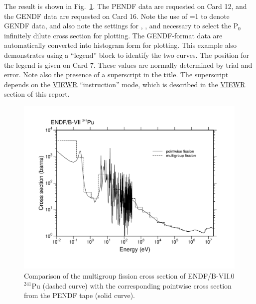 \noindent
The result is shown in Fig.~\ref{pvsm}.  The PENDF data are requested
on Card 12, and the GENDF data are requested on Card 16.  Note the
use of =1 to denote GENDF data, and also note the settings
for , , and  necessary to select the
P$_0$ infinitely dilute cross section for plotting.  The GENDF-format
data are automatically converted into histogram form for plotting.
This example also demonstrates using a ``legend'' block to identify
the two curves.  The position for the legend is given on Card 7.
These values are normally determined by trial and error.  Note also
the presence of a superscript in the title.  The superscript depends
on the \hyperlink{sVIEWRhy}{VIEWR} ``instruction'' mode, which
is described in the \hyperlink{sVIEWRhy}{VIEWR} section of this report.

\begin{figure}[thb]\centering
\includegraphics[keepaspectratio, height=3.4in, angle=0]{figs/plotr5ack}
\caption[Sample plot with pointwise and multigroup data]{Comparison of
 the multigroup fission cross section of ENDF/B-VII.0 $^{241}$Pu (dashed curve)
 with the corresponding pointwise cross section from the PENDF tape
 (solid curve).}
\label{pvsm}
\end{figure}

